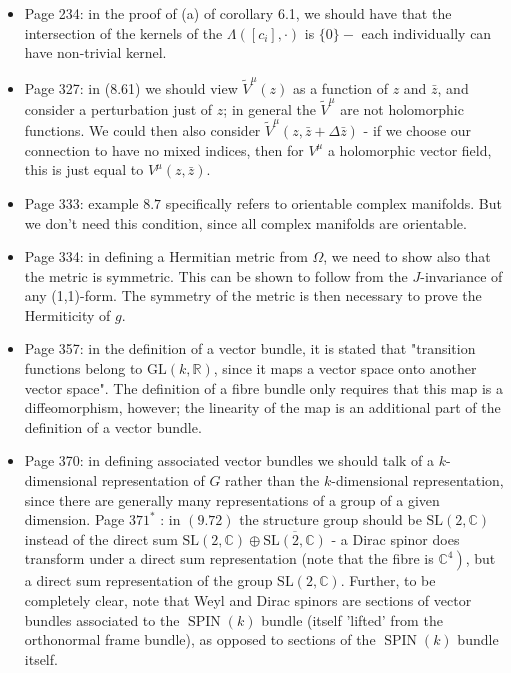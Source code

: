 \documentclass{article}
\begin{document}
\begin{itemize}
\item Page 234: in the proof of (a) of corollary 6.1, we should have that the intersection of the kernels of the $\Lambda\left(\left[c_{i}\right], \cdot\right)$ is $\{0\}-$ each individually can have non-trivial kernel.

\item Page 327: in (8.61) we should view $\tilde{V}^{\mu}(z)$ as a function of $z$ and $\bar{z}$, and consider a perturbation just of $z$; in general the $\tilde{V}^{\mu}$ are not holomorphic functions. We could then also consider $\tilde{V}^{\mu}(z, \bar{z}+\Delta \bar{z})$ - if we choose our connection to have no mixed indices, then for $V^{\mu}$ a holomorphic vector field, this is just equal to $V^{\mu}(z, \bar{z})$.

\item Page 333: example $8.7$ specifically refers to orientable complex manifolds. But we don't need this condition, since all complex manifolds are orientable.

\item Page 334: in defining a Hermitian metric from $\Omega$, we need to show also that the metric is symmetric. This can be shown to follow from the $J$-invariance of any (1,1)-form. The symmetry of the metric is then necessary to prove the Hermiticity of $g$.

\item Page 357: in the definition of a vector bundle, it is stated that "transition functions belong to $\mathrm{GL}(k, \mathbb{R})$, since it maps a vector space onto another vector space". The definition of a fibre bundle only requires that this map is a diffeomorphism, however; the linearity of the map is an additional part of the definition of a vector bundle.

\item Page 370: in defining associated vector bundles we should talk of a $k$-dimensional representation of $G$ rather than the $k$-dimensional representation, since there are generally many representations of a group of a given dimension. Page $371^{*}$ : in $(9.72)$ the structure group should be $\mathrm{SL}(2, \mathbb{C})$ instead of the direct sum $\mathrm{SL}(2, \mathbb{C}) \oplus \overline{\mathrm{SL}(2, \mathbb{C})}$ - a Dirac spinor does transform under a direct sum representation (note that the fibre is $\left.\mathbb{C}^{4}\right)$, but a direct sum representation of the group $\mathrm{SL}(2, \mathbb{C})$. Further, to be completely clear, note that Weyl and Dirac spinors are sections of vector bundles associated to the $\operatorname{SPIN}(k)$ bundle (itself 'lifted' from the orthonormal frame bundle), as opposed to sections of the $\operatorname{SPIN}(k)$ bundle itself.


\end{itemize}
\end{document}
